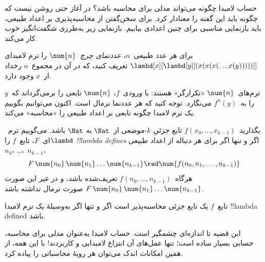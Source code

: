 \documentclass[../../../include/open-logic-section]{subfiles}
\begin{document}

حساب لامبدا چگونه می‌تواند مدلی برای محاسبه باشد؟ در آغاز حتی روشن نیست
که چگونه باید این گفته را معنادار کرد. برای سخن‌گفتن از محاسبه‌پذیری بر
اعداد طبیعی، باید بازنمایی مناسبی برای چنین اعدادی بیابیم. بازنمایی زیر
به‌طرزی شگفت‌انگیز خوب کار می‌کند.

\begin{defn}
برای هر عدد طبیعی~$n$، \emph{عددنمای چرچ}~$\num{n}$ را ترم لامبدای
$\lambd[x][\lambd[y][(x(x(x(\dots x(y)))))]]$ تعریف کنید، که در آن
در مجموع~$n$ رخداد از~$x$ وجود دارد.
\end{defn}

ترم‌های~$\num{n}$ «تکرارگر» هستند: با ورودی~$f$، $\num{n}$ تابعی را
برمی‌گرداند که~$y$ را به~$f^n(y)$ می‌نگارد. توجه کنید که هر عددنما نرمال
است. اکنون می‌توانیم بگوییم یک ترم لامبدا چگونه تابعی بر اعداد طبیعی را
«محاسبه» می‌کند.

\begin{defn}
بگذارید~$f(x_0, \dots, x_{k-1})$ تابع جزئیِ $k$-موضعی از~$\Nat$ به
$\Nat$ باشد. می‌گوییم ترم~$\lambd$ای~$F$، تابع~$f$ را
\emph{!!{lambda define}s} اگر و تنها اگر برای هر دنباله از اعداد طبیعی
$n_0$، \dots،~$n_{k-1}$،
\[
F\, \num{n_0}\, \num{n_1} \dots \num{n_{k-1}} \red \num{f(n_0, n_1, \dots,
  n_{k-1})}
\]
هرگاه~$f(n_0, \dots, n_{k-1})$ تعریف‌شده باشد، و در غیر این صورت
$F\, \num{n_0}\, \num{n_1} \dots \num{n_{k-1}}$ صورت نرمال نداشته
باشد.
\end{defn}

\begin{thm}
تابع~$f$ یک تابع جزئی محاسبه‌پذیر است اگر و تنها اگر به‌وسیلهٔ یک ترم
لامبدا !!{lambda defined} باشد.
\end{thm}

\begin{explain}
این قضیه تا اندازه‌ای چشمگیر است. حساب لامبدا به‌عنوان مدلی برای محاسبه،
حسابی بسیار ساده است؛ تنها عمل‌های آن انتزاع لامبدایی و کاربردند!{} با
این همه، از همین امکانات اندک می‌توان هر رویهٔ محاسباتی را پیاده کرد.
\end{explain}
\end{document}

